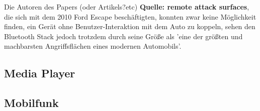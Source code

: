 \documentclass[
    fontsize=12pt,
    headings=small,
    parskip=half,           %
    bibliography=totoc,9
    numbers=noenddot,       %
    open=any,               %
    ]{scrreprt}
\begin{document}
Die Autoren des Papers (oder Artikels?etc) \textbf{Quelle: remote attack surfaces}, die sich mit dem 2010 Ford Escape beschäftigten, konnten zwar keine Möglichkeit finden, ein Gerät ohne Benutzer-Interaktion mit dem Auto zu koppeln, sehen den Bluetooth Stack jedoch trotzdem durch seine Größe als 'eine der größten und machbarsten Angriffsflächen eines modernen Automobils'.

\subsection{Media Player}

\subsection{Mobilfunk}
\end{document}
